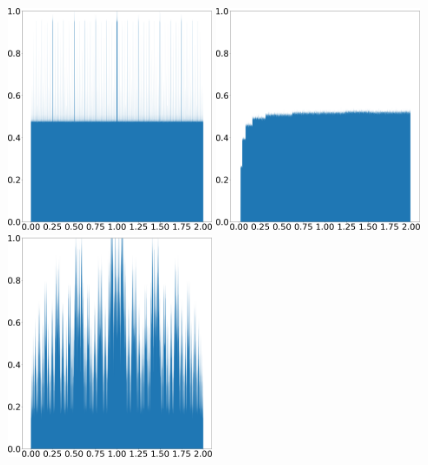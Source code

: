 \begin{figure}[H]
    \centering
    \includegraphics[width=0.48\textwidth]{figure/tent_squashed_shadow_density_0.01.png}
    \hspace{0.02\textwidth}
    \includegraphics[width=0.48\textwidth]{figure/tent_squashed_physical_density_0.01.png}
    \\ \vspace{0.02\textwidth}
    \includegraphics[width=0.48\textwidth]{figure/tent_squashed_shadow_density_0.2.png}
    \hspace{0.02\textwidth}

\end{figure}
